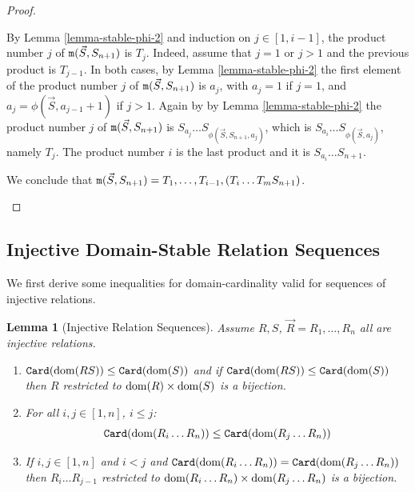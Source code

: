 \documentclass{lmcs}
\newtheorem{lemma}[theorem]{Lemma}
\begin{document}
\begin{proof}
\begin{enumerate}
\begin{enumerate}
By Lemma \ref{lemma-stable-phi-2} and induction on $j \in [1,i-1]$,
the product number $j$ of ${\tt m}(\vec{S},S_{n+1})$ is $T_j$.
Indeed, assume that $j=1$ or $j>1$ and the previous product is $T_{j-1}$.
In both cases, by Lemma \ref{lemma-stable-phi-2} the first element
of the product number $j$ of ${\tt m}(\vec{S},S_{n+1})$
is $a_j$, with $a_j = 1$ if $j=1$, and $a_j = \phi(\vec{S},a_ {j-1}+1)$ if $j>1$. 
Again by by Lemma \ref{lemma-stable-phi-2} the product number $j$ 
of ${\tt m}(\vec{S},S_{n+1})$ is $S_{a_j} \ldots S_{\phi(\vec{S},S_{n+1},a_j)}$, 
which is $S_{a_i} \ldots S_{\phi(\vec{S},a_j)}$, namely $T_j$.
The product number $i$ is the last product and it is $S_{a_i} \ldots S_{n+1}$.

We conclude that 
${\tt m}(\vec{S}, S_{n+1}) = T_1, \ldots, T_{i-1}, (T_i \ldots T_m S_{n+1})$.
\end{enumerate}
\end{enumerate}
\end{proof}



\subsection{Injective Domain-Stable Relation Sequences}

We first derive some inequalities for domain-cardinality
valid for sequences of injective relations.

\begin{lemma}[Injective Relation Sequences]
\label{lemma-stable-sequences}
Assume $R, S$, $\vec{R}=R_1, \ldots, R_n$ all are \emph{injective} relations.
\begin{enumerate}
\item
${\tt Card}({\rm dom}(RS)) \le {\tt Card}({\rm dom}(S))$
and if ${\tt Card}({\rm dom}(RS)) \le {\tt Card}({\rm dom}(S))$ then $R$ restricted to ${\rm dom}(R) \times {\rm dom}(S)$
is a bijection.

\item
For all $i,j \in [1,n]$, $i \le j$:
$$
{\tt Card}({\rm dom}(R_i \ldots R_n)) \le {\tt Card}({\rm dom}(R_j \ldots R_n))
$$

\item
If  $i, j \in[1,n]$ and $i < j$ and ${\tt Card}({\rm dom}(R_i \ldots R_n)) = {\tt Card}({\rm dom}(R_j \ldots R_n))$
then $R_i \ldots R_{j-1}$ restricted to ${\rm dom}(R_i \ldots R_n) \times {\rm dom}(R_j \ldots R_n)$
is a bijection.
\end{enumerate}
\end{lemma}
\end{document}
